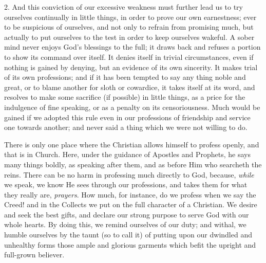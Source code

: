2. And this conviction of our excessive weakness must
further lead us to try ourselves continually in little
things, in order to prove our own earnestness; ever to be
suspicious of ourselves, and not only to refrain from
promising much, but actually to put ourselves to the test
in order to keep ourselves wakeful. A sober mind never
enjoys God's blessings to the full; it draws back and
refuses a portion to show its command over itself. It
denies itself in trivial circumstances, even if nothing
is gained by denying, but an evidence of its own
sincerity. It makes trial of its own professions; and if
it has been tempted to say any thing noble and great, or
to blame another for sloth or cowardice, it takes itself
at its word, and resolves to make some sacrifice (if
possible) in little things, as a price for the indulgence
of fine speaking, or as a penalty on its censoriousness.
Much would be gained if we adopted this rule even in our
professions of friendship and service one towards
another; and never said a thing which we were not willing
to do.

There is only one place where the Christian allows
himself to profess openly, and that is in Church. Here,
under the guidance of Apostles and Prophets, he says many
things boldly, as speaking after them, and as before Him
who searcheth the reins. There can be no harm in
professing much directly to God, because, \emph{while} we
speak, we know He sees through our professions, and takes
them for what they really are, \emph{prayers}. How much,
for instance, do we profess when we say the Creed! and in
the Collects we put on the full character of a Christian.
We desire and seek the best gifts, and declare our strong
purpose to serve God with our whole hearts. By doing
this, we remind ourselves of our duty; and withal, we
humble ourselves by the taunt (so to call it) of putting
upon our dwindled and unhealthy forms those ample and
glorious garments which befit the upright and full-grown
believer.

